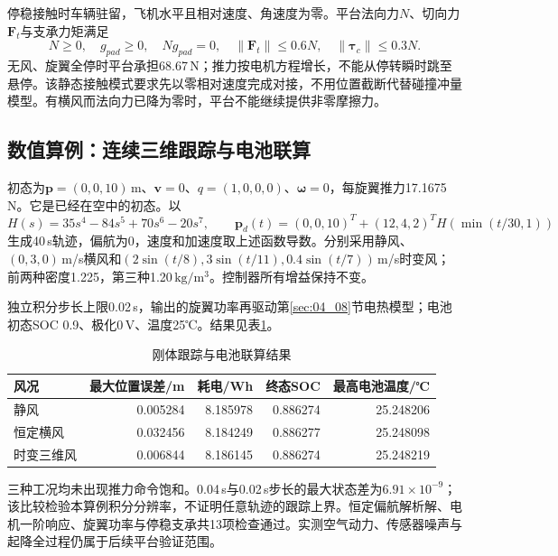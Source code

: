 停稳接触时车辆驻留，飞机水平且相对速度、角速度为零。平台法向力$N$、切向力$\mathbf F_t$与支承力矩满足
\begin{equation}
 N\ge0,\quad g_{pad}\ge0,\quad Ng_{pad}=0,\quad
 \|\mathbf F_t\|\le0.6N,\quad\|\boldsymbol\tau_c\|\le0.3N.
 \label{s0404:reference_contact}
\end{equation}
无风、旋翼全停时平台承担68.67\,N；推力按电机方程增长，不能从停转瞬时跳至悬停。该静态接触模式要求先以零相对速度完成对接，不用位置截断代替碰撞冲量模型。有横风而法向力已降为零时，平台不能继续提供非零摩擦力。

\subsection{数值算例：连续三维跟踪与电池联算}

初态为$\mathbf p=(0,0,10)$\,m、$\mathbf v=0$、$q=(1,0,0,0)$、$\boldsymbol\omega=0$，每旋翼推力17.1675\,N。它是已经在空中的初态。以
\begin{equation}
 H(s)=35s^4-84s^5+70s^6-20s^7,\qquad
 \mathbf p_d(t)=(0,0,10)^T+(12,4,2)^TH(\min(t/30,1))
\end{equation}
生成40\,s轨迹，偏航为0，速度和加速度取上述函数导数。分别采用静风、$(0,3,0)$\,m/s横风和$(2\sin(t/8),3\sin(t/11),0.4\sin(t/7))$\,m/s时变风；前两种密度1.225，第三种1.20\,$\mathrm{kg/m^3}$。控制器所有增益保持不变。

独立积分步长上限0.02\,s，输出的旋翼功率再驱动第\ref{sec:04_08}节电热模型；电池初态SOC 0.9、极化0\,V、温度25℃。结果见表\ref{tab:rigid_battery_results}。
\begin{table}[!ht]\centering
\caption{刚体跟踪与电池联算结果}\label{tab:rigid_battery_results}
\begin{tabular}{lrrrr}\toprule
风况 & 最大位置误差/m & 耗电/Wh & 终态SOC & 最高电池温度/℃\\\midrule
静风 & 0.005284 & 8.185978 & 0.886274 & 25.248206\\
恒定横风 & 0.032456 & 8.184249 & 0.886277 & 25.248098\\
时变三维风 & 0.006844 & 8.186145 & 0.886274 & 25.248219\\
\bottomrule\end{tabular}\end{table}
三种工况均未出现推力命令饱和。0.04\,s与0.02\,s步长的最大状态差为$6.91\times10^{-9}$；该比较检验本算例积分分辨率，不证明任意轨迹的跟踪上界。恒定偏航解析解、电机一阶响应、旋翼功率与停稳支承共13项检查通过。实测空气动力、传感器噪声与起降全过程仍属于后续平台验证范围。


